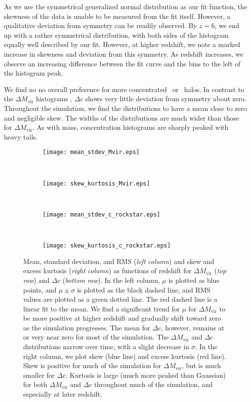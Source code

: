 As we use the symmetrical generalized normal distribution as our fit function, the skewness of the data is unable to be measured from the fit itself.  However, a qualitative deviation from symmetry can be readily observed.  By $z = 6$, we end up with a rather symmetrical distribution, with both sides of the histogram equally well described by our fit.  However, at higher redshift, we note a marked increase in skewness and deviation from this symmetry.  As redshift increases, we observe an increasing difference between the fit curve and the bins to the left of the histogram peak.

We find no no overall preference for more concentrated \lpt\ or \za\ halos.  In contrast to the $\Delta M_{\mathrm{vir}}$ histograms , $\Delta c$ shows very little deviation from symmetry about zero.  Throughout the simulation, we find the distributions to have a mean close to zero and negligible skew.  The widths of the distributions are much wider than those for $\Delta M_{\mathrm{vir}}$.  As with mass, concentration histograms are sharply peaked with heavy tails.

\begin{figure*}[t]
	\centering
	\begin{subfigure}{}
		\texttt{[image: mean\_stdev\_Mvir.eps]}
	\end{subfigure}
	~
	\begin{subfigure}{}
		\texttt{[image: skew\_kurtosis\_Mvir.eps]}
	\end{subfigure}
	\\
	\begin{subfigure}{}
		\texttt{[image: mean\_stdev\_c\_rockstar.eps]}
	\end{subfigure}
	~
	\begin{subfigure}{}
		\texttt{[image: skew\_kurtosis\_c\_rockstar.eps]}
	\end{subfigure}
	\caption[Statistics as functions of redshift for generalized normal fits]{\footnotesize Mean, standard deviation, and RMS (\textit{left column}) and skew and excess kurtosis (\textit{right column}) as functions of redshift for $\Delta M_{\mathrm{vir}}$ (\textit{top row}) and $\Delta c$ (\textit{bottom row}).  In the left column, $\mu$ is plotted as blue points, and $\mu \pm \sigma$ is plotted as the black dashed line, and RMS values are plotted as a green dotted line.  The red dashed line is a linear fit to the mean.  We find a significant trend for $\mu$ for $\Delta M_{\mathrm{vir}}$ to be more positive at higher redshift and gradually shift toward zero as the simulation progresses.  The mean for $\Delta c$, however, remains at or very near zero for most of the simulation.  The $\Delta M_{\mathrm{vir}}$ and $\Delta c$ distributions narrow over time, with a slight decrease in $\sigma$.  In the right column, we plot skew (blue line) and excess kurtosis (red line).  Skew is positive for much of the simulation for $\Delta M_{\mathrm{vir}}$, but is much smaller for $\Delta c$.  Kurtosis is large (much more peaked than Gaussian) for both $\Delta M_{\mathrm{vir}}$ and $\Delta c$ throughout much of the simulation, and especially at later redshift.}
	\label{fig:fit_trends}
\end{figure*}


